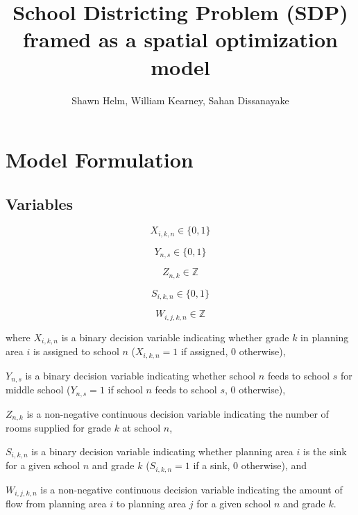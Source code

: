 \documentclass[12pt]{article}
\title{School Districting Problem (SDP) framed as a spatial optimization model}
\author{Shawn Helm, William Kearney, Sahan Dissanayake}
\begin{document}
\maketitle

\section{Model Formulation}

\subsection{Variables}

\begin{equation}
	X_{i,k,n} \in \{0,1\}
\end{equation}

\begin{equation}
	Y_{n,s} \in \{0,1\}
\end{equation}

\begin{equation}
	Z_{n,k} \in \mathbb{Z}
\end{equation}

\begin{equation}
	S_{i,k,n} \in \{0,1\}
\end{equation}

\begin{equation}
	W_{i,j,k,n} \in \mathbb{Z}
\end{equation}

where $X_{i,k,n}$ is a binary decision variable indicating whether grade $k$ in planning area $i$ is assigned to school $n$ ($X_{i,k,n}=1$ if assigned, 0 otherwise),

$Y_{n,s}$ is a binary decision variable indicating whether school $n$ feeds to school $s$ for middle school ($Y_{n,s}=1$ if school $n$ feeds to school $s$, 0 otherwise),

$Z_{n,k}$ is a non-negative continuous decision variable indicating the number of rooms supplied for grade $k$ at school $n$,

$S_{i,k,n}$ is a binary decision variable indicating whether planning area $i$ is the sink for a given school $n$ and grade $k$ ($S_{i,k,n}=1$ if a sink, 0 otherwise), and

$W_{i,j,k,n}$ is a non-negative continuous decision variable indicating the amount of flow from planning area $i$ to planning area $j$ for a given school $n$ and grade $k$.
\end{document}
